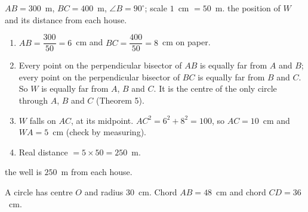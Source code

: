\begin{answerblock}
\begin{minipage}[t]{0.66\linewidth}\vspace{0pt}
\Given $AB=300$~m, $BC=400$~m, $\angle B=90^\circ$; scale $1$~cm $=50$~m. \Tofind the position of $W$ and its distance from each house.
\begin{enumerate}[label=\arabic*.,leftmargin=1.6em,itemsep=0pt,topsep=2pt]
\item $AB=\dfrac{300}{50}=6$~cm and $BC=\dfrac{400}{50}=8$~cm on paper.
\item Every point on the perpendicular bisector of $AB$ is equally far from $A$ and $B$; every point on the perpendicular bisector of $BC$ is equally far from $B$ and $C$. So $W$ is equally far from $A$, $B$ and $C$. It is the centre of the only circle through $A$, $B$ and $C$ (Theorem 5).
\item $W$ falls on $AC$, at its midpoint. $AC^2=6^2+8^2=100$, so $AC=10$~cm and $WA=5$~cm (check by measuring).
\item Real distance $=5\times50=250$~m.
\end{enumerate}
\Ans the well is $250$~m from each house.
\end{minipage}\hfill
\begin{minipage}[t]{0.3\linewidth}\vspace{0pt}
\centering
{}
\end{minipage}
\end{answerblock}

\ques A circle has centre $O$ and radius $30$~cm. Chord $AB=48$~cm and chord $CD=36$~cm.

